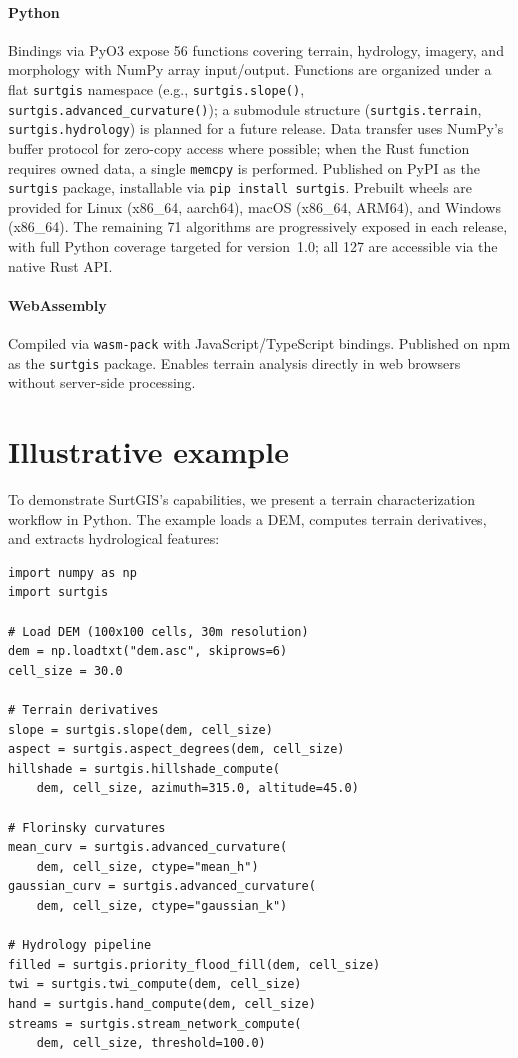 \documentclass[preprint,review,12pt,authoryear]{elsarticle}
\begin{document}
\paragraph{Python} Bindings via PyO3 \citep{pyo3_2024} expose 56 functions covering terrain, hydrology, imagery, and morphology with NumPy array input/output. Functions are organized under a flat \texttt{surtgis} namespace (e.g., \texttt{surtgis.slope()}, \texttt{surtgis.advanced\_curvature()}); a submodule structure (\texttt{surtgis.terrain}, \texttt{surtgis.hydrology}) is planned for a future release. Data transfer uses NumPy's buffer protocol for zero-copy access where possible; when the Rust function requires owned data, a single \texttt{memcpy} is performed. Published on PyPI as the \texttt{surtgis} package, installable via \texttt{pip install surtgis}. Prebuilt wheels are provided for Linux (x86\_64, aarch64), macOS (x86\_64, ARM64), and Windows (x86\_64). The remaining 71 algorithms are progressively exposed in each release, with full Python coverage targeted for version~1.0; all 127 are accessible via the native Rust API.

\paragraph{WebAssembly} Compiled via \texttt{wasm-pack} with JavaScript/TypeScript bindings. Published on npm as the \texttt{surtgis} package. Enables terrain analysis directly in web browsers without server-side processing.

\section{Illustrative example}
\label{sec:example}

To demonstrate SurtGIS's capabilities, we present a terrain characterization workflow in Python. The example loads a DEM, computes terrain derivatives, and extracts hydrological features:

\begin{verbatim}
import numpy as np
import surtgis

# Load DEM (100x100 cells, 30m resolution)
dem = np.loadtxt("dem.asc", skiprows=6)
cell_size = 30.0

# Terrain derivatives
slope = surtgis.slope(dem, cell_size)
aspect = surtgis.aspect_degrees(dem, cell_size)
hillshade = surtgis.hillshade_compute(
    dem, cell_size, azimuth=315.0, altitude=45.0)

# Florinsky curvatures
mean_curv = surtgis.advanced_curvature(
    dem, cell_size, ctype="mean_h")
gaussian_curv = surtgis.advanced_curvature(
    dem, cell_size, ctype="gaussian_k")

# Hydrology pipeline
filled = surtgis.priority_flood_fill(dem, cell_size)
twi = surtgis.twi_compute(dem, cell_size)
hand = surtgis.hand_compute(dem, cell_size)
streams = surtgis.stream_network_compute(
    dem, cell_size, threshold=100.0)
\end{verbatim}
\end{document}
